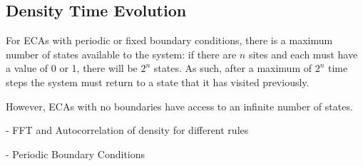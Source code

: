 \subsection{Density Time Evolution}
For ECAs with periodic or fixed boundary conditions, there is a
maximum number of states available to the system: if there are $n$
sites and each must have a value of 0 or 1, there will be $2^n$
states.
As such, after a maximum of $2^n$ time steps the system must return to
a state that it has visited previously.

However, ECAs with no boundaries have access to an infinite number of
states.

 - FFT and Autocorrelation of density for different rules

 - Periodic Boundary Conditions
